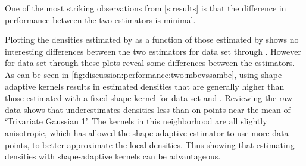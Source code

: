
One of the most striking observations from \cref{s:results} is that the difference in performance between the two estimators is minimal.

		Plotting the densities estimated by \sambe as a function of those estimated by \mbe shows no interesting differences between the two estimators for data set \ferdosiOne through \baakmanFive.
		However for data set \ferdosiTwo through \baakmanThree these plots reveal some differences between the estimators. As can be seen in \cref{fig:discussion:performance:two:mbevssambe}, using shape-adaptive kernels results in estimated densities that are generally higher than those estimated with a fixed-shape kernel for data set \ferdosiTwo and \baakmanTwo. Reviewing the raw data shows that \sambe underestimates densities less than \mbe on points near the mean of `Trivariate Gaussian 1'. The kernels in this neighborhood are all slightly anisotropic, which has allowed the shape-adaptive estimator to use more data points, to better approximate the local densities. Thus showing that estimating densities with shape-adaptive kernels can be advantageous.
